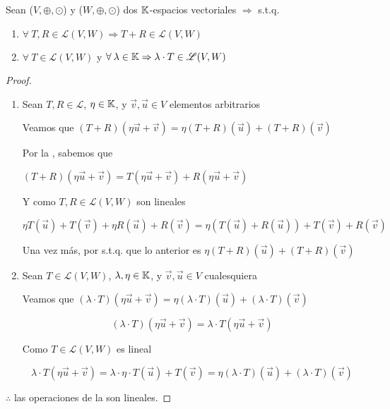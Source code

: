 \begin{theorem}
    Sean ($V, \oplus, \odot$) y ($W, \oplus, \odot$) dos $\mathbb{K}$-espacios vectoriales $\Rightarrow$ s.t.q.

    \begin{enumerate}
        \item $\forall \: T, R \in \mathscr{L}(V,W) \Rightarrow T+ R \in \mathscr{L}(V,W) $
        \item $\forall \: T \in \mathscr{L}(V,W)$ y $\forall \: \lambda \in \mathbb{K} \Rightarrow \lambda \cdot T \in \mathscr{L}(V,W) \: $
    \end{enumerate}
\end{theorem}

\begin{proof}
    \begin{enumerate}
        \item Sean $ T, R \in \mathscr{L}$, $\eta \in \mathbb{K}$, y $\vec{v}, \vec{u} \in V$ elementos arbitrarios

        Veamos que $(T+R)(\eta \vec{u} + \vec{v}) = \eta (T+R)(\vec{u}) + (T+R)(\vec{v})$

        Por la , sabemos que 

        $(T+R)(\eta \vec{u} + \vec{v}) = T(\eta \vec{u} + \vec{v}) + R(\eta \vec{u} + \vec{v})$

        Y como $T, R \in \mathscr{L}(V,W)$ son lineales

        $$\eta T(\vec{u}) + T(\vec{v}) + \eta R(\vec{u}) + R(\vec{v})  = \eta (T(\vec{u}) + R(\vec{u}) ) + T(\vec{v}) + R(\vec{v})$$

        Una vez más, por  s.t.q. que lo anterior es $\eta (T+R)(\vec{u}) + (T+R)(\vec{v})$

        \item Sean $T \in \mathscr{L}(V,W)$, $\lambda, \eta \in \mathbb{K}$, y $\vec{v}, \vec{u} \in V$ cualesquiera

        Veamos que $(\lambda \cdot T)(\eta \vec{u} + \vec{v}) = \eta (\lambda \cdot T)(\vec{u}) + (\lambda \cdot T)(\vec{v})$

        $$ (\lambda \cdot T)(\eta \vec{u} + \vec{v})  = \lambda \cdot T(\eta \vec{u} + \vec{v}) $$
        
        Como $T \in \mathscr{L}(V,W)$ es lineal

        $$ \lambda \cdot T(\eta \vec{u} + \vec{v}) = \lambda \cdot \eta \cdot T(\vec{u} ) + T(\vec{v} ) =  \eta (\lambda \cdot T)(\vec{u}) + (\lambda \cdot T)(\vec{v}) $$
    \end{enumerate}

    $\therefore$ las operaciones de la  son lineales.
\end{proof}

